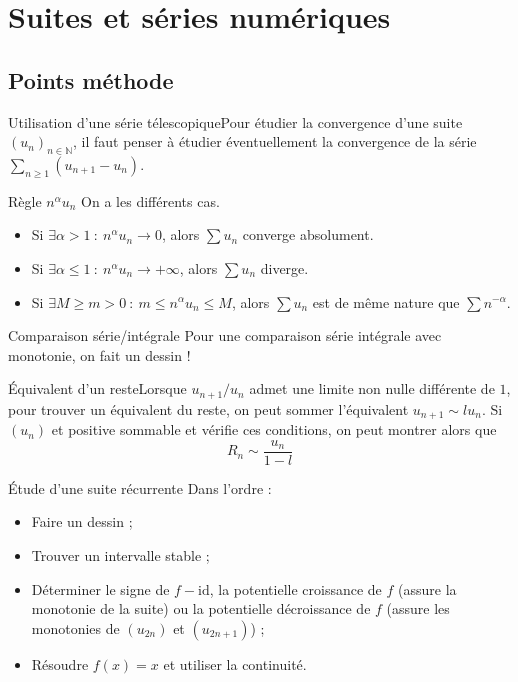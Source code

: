 \documentclass[french]{book}
\newcommand{\N}{\mathbb{N}}
\theoremstyle{plain}
\theoremstyle{definition}
\theoremstyle{remark}
\begin{document}
\chapter{Suites et séries numériques}
\localtableofcontents
\section{Points méthode}
\begin{PM}{Utilisation d'une série télescopique}Pour étudier la convergence d'une suite $(u_n)_{n\in\N}$, il faut penser à étudier éventuellement la convergence de la série $\displaystyle\sum_{n\geqslant 1}(u_{n+1}-u_n)$.
\end{PM}
\begin{PM}{Règle $n^\alpha u_n$} On a les différents cas.
\begin{itemize}
	\item Si $\exists\alpha >1 \ : \ n^\alpha u_n\to 0$, alors $\sum u_n$ converge absolument.
	\item Si $\exists\alpha \leqslant1 \ : \ n^\alpha u_n\to+\infty$, alors $\sum u_n$ diverge.
	\item Si $\exists M\geqslant m>0\ : \ m\leqslant n^\alpha u_n\leqslant M$, alors $\sum u_n$ est de même nature que $\sum n^{-\alpha}$.
\end{itemize}
\end{PM}
\begin{PM}{Comparaison série/intégrale} Pour une comparaison série intégrale avec monotonie, on fait un dessin !
\end{PM}
\begin{PM}{Équivalent d'un reste}Lorsque $u_{n+1}/u_n$ admet une limite non nulle différente de $1$, pour trouver un équivalent du reste, on peut sommer l'équivalent $u_{n+1}\sim lu_n$. Si $(u_n)$ et positive sommable et vérifie ces conditions, on peut montrer alors que $$R_n\sim\frac{u_n}{1-l}$$
\end{PM}
\begin{PM}{Étude d'une suite récurrente} Dans l'ordre :
\begin{itemize}
	\item Faire un dessin ;
	\item Trouver un intervalle stable ;
	\item Déterminer le signe de $f-\text{id}$, la potentielle croissance de $f$ (assure la monotonie de la suite) ou la potentielle décroissance de $f$ (assure les monotonies de $(u_{2n})$ et $(u_{2n+1})$) ;
	\item Résoudre $f(x)=x$ et utiliser la continuité.
\end{itemize}
\end{PM}
\end{document}
